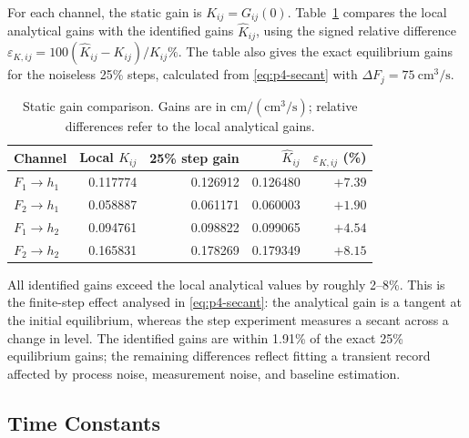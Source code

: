 For each channel, the static gain is $K_{ij}=G_{ij}(0)$.
Table~\ref{tab:p5-gains} compares the local analytical gains with the
identified gains $\widehat K_{ij}$, using the signed relative difference
$\varepsilon_{K,ij}=100(\widehat K_{ij}-K_{ij})/K_{ij}\%$. The table also
gives the exact equilibrium gains for the noiseless 25\% steps, calculated
from \eqref{eq:p4-secant} with $\Delta F_j=75\ \mathrm{cm^3/s}$.
\begin{table}[htbp]
 \centering
 \caption{Static gain comparison. Gains are in
 $\mathrm{cm/(cm^3/s)}$; relative differences refer to the local
 analytical gains.}
 \label{tab:p5-gains}
 \begin{tabular}{lrrrr}
 \hline
 Channel & Local $K_{ij}$ & 25\% step gain & $\widehat K_{ij}$ &
 $\varepsilon_{K,ij}$ (\%)\\
 \hline
 $F_1\to h_1$ & 0.117774 & 0.126912 & 0.126480 & $+7.39$\\
 $F_2\to h_1$ & 0.058887 & 0.061171 & 0.060003 & $+1.90$\\
 $F_1\to h_2$ & 0.094761 & 0.098822 & 0.099065 & $+4.54$\\
 $F_2\to h_2$ & 0.165831 & 0.178269 & 0.179349 & $+8.15$\\
 \hline
 \end{tabular}
\end{table}

All identified gains exceed the local analytical values by roughly
2--8\%. This is the finite-step effect analysed in \eqref{eq:p4-secant}:
the analytical gain is a tangent at the initial equilibrium, whereas the
step experiment measures a secant across a change in level. The
identified gains are within 1.91\% of the exact 25\% equilibrium gains;
the remaining differences reflect fitting a transient record affected by
process noise, measurement noise, and baseline estimation.

\subsection{Time Constants}

